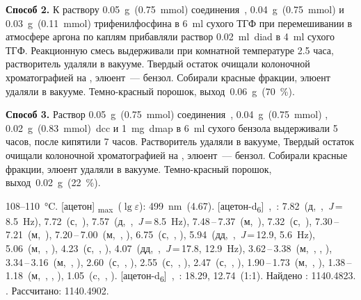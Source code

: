\textbf{Способ 2.}
К раствору \SI{0.05}{\gram}~(\SI{0.75}{\milli\mole}) соединения~, \SI{0.04}{\gram}~(\SI{0.75}{\milli\mole})  и \SI{0.03}{\gram}~(\SI{0.11}{\milli\mole}) трифенилфосфина в \SI{6}{\milli\litre} сухого ТГФ при перемешивании в атмосфере аргона по каплям прибавляли раствор \SI{0.02}{\milli\litre}~\ac{diad} в \SI{4}{\milli\litre} сухого ТГФ. Реакционную смесь выдерживали при комнатной температуре 2.5 часа, растворитель удаляли в вакууме. Твердый остаток очищали колоночной хроматографией на , элюент~--- бензол. Собирали красные фракции, элюент удаляли в вакууме. Темно-красный порошок, выход~\SI{0.06}{\gram}~(\SI{70}{\percent}).

\textbf{Способ 3.}
Раствор \SI{0.05}{\gram}~(\SI{0.75}{\milli\mole}) соединения~, \SI{0.04}{\gram}~(\SI{0.75}{\milli\mole}) , \SI{0.02}{\gram}~(\SI{0.83}{\milli\mole})~\ac{dcc} и \SI{1}{\milli\gram}~\ac{dmap} в \SI{6}{\milli\litre} сухого бензола выдерживали 5 часов, после кипятили 7 часов. Растворитель удаляли в вакууме, Твердый остаток очищали колоночной хроматографией на , элюент~--- бензол. Собирали красные фракции, элюент удаляли в вакууме. Темно-красный порошок, выход~\SI{0.02}{\gram}~(\SI{22}{\percent}).
\begin{experimental}
     108--\SI{110}{\celsius}.
    [ацетон] \chemlambda\textsubscript{max}~($\lg \varepsilon$): \SI{499}{\nano\metre}~(4.67).
    [ацетон-d\textsubscript{6}]~\chemdelta,~\si{\ppm}: 7.82~(д,~,~\textit{J}\,=\,8.5~\si{\hertz}), 7.72~(с,~), 7.57~(д,~,~\textit{J}\,=\,8.5~\si{\hertz}), 7.48\,--\,7.37~(м,~), 7.32~(с,~), 7.30\,--\,7.21~(м,~), 7.20\,--\,7.00~(м,~, ), 6.75~(с,~, ), 5.94~(дд,~,~\textit{J}\,=\,12.9, 5.6~\si{\hertz}), 5.06~(м,~, ), 4.23~(с,~, ), 4.07~(дд,~,~\textit{J}\,=\,17.8, 12.9~\si{\hertz}), 3.62\,--\,3.38~(м,~, , ), 3.34\,--\,3.16~(м,~, ), 2.60~(с,~, ), 2.55~(с,~, ), 2.47~(с,~, ), 1.90\,--\,1.73~(м,~, ), 1.38\,--\,1.18~(м,~, , ), 1.05~(c,~, ).
    [ацетон-d\textsubscript{6}]~\chemdelta,~\si{\ppm}: 18.29, 12.74~(1:1).
     Найдено \ce{[M + H]+}: \num{1140.4823}. . Рассчитано: \ce{[M + H]} \num{1140.4902}.
\end{experimental}

